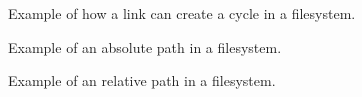\begin{figure}[tbp]
  
  \caption{Example of how a link can create a cycle in a filesystem.}
  \label{fig:bs:fs:cycles}
\end{figure}

\begin{figure}[tbp]
  
  \caption{Example of an absolute path in a filesystem.}
  \label{fig:bs:fs:path:abs}
\end{figure}

\begin{figure}[tbp]
  
  \caption{Example of an relative path in a filesystem.}
  \label{fig:bs:fs:path:rel}
\end{figure}


